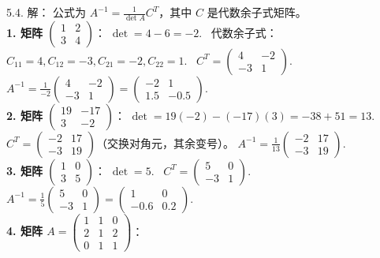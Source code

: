 \begin{exer}
5.4. 解：
公式为 $A^{-1} = \frac{1}{\det A} C^T$，其中 $C$ 是代数余子式矩阵。\\
\textbf{1. 矩阵 $\begin{pmatrix} 1 & 2 \\ 3 & 4 \end{pmatrix}$}：
$\det = 4 - 6 = -2$.~
代数余子式：$C_{11}=4, C_{12}=-3, C_{21}=-2, C_{22}=1$.~
$C^T = \begin{pmatrix} 4 & -2 \\ -3 & 1 \end{pmatrix}$.~
$A^{-1} = \frac{1}{-2} \begin{pmatrix} 4 & -2 \\ -3 & 1 \end{pmatrix} = \begin{pmatrix} -2 & 1 \\ 1.5 & -0.5 \end{pmatrix}$.~
\\
\textbf{2. 矩阵 $\begin{pmatrix} 19 & -17 \\ 3 & -2 \end{pmatrix}$}：
$\det = 19(-2) - (-17)(3) = -38 + 51 = 13$.~
$C^T = \begin{pmatrix} -2 & 17 \\ -3 & 19 \end{pmatrix}$（交换对角元，其余变号）。
$A^{-1} = \frac{1}{13} \begin{pmatrix} -2 & 17 \\ -3 & 19 \end{pmatrix}$.~
\\
\textbf{3. 矩阵 $\begin{pmatrix} 1 & 0 \\ 3 & 5 \end{pmatrix}$}：
$\det = 5$.~
$C^T = \begin{pmatrix} 5 & 0 \\ -3 & 1 \end{pmatrix}$.~
$A^{-1} = \frac{1}{5} \begin{pmatrix} 5 & 0 \\ -3 & 1 \end{pmatrix} = \begin{pmatrix} 1 & 0 \\ -0.6 & 0.2 \end{pmatrix}$.~
\\
\textbf{4. 矩阵 $A = \begin{pmatrix} 1 & 1 & 0 \\ 2 & 1 & 2 \\ 0 & 1 & 1 \end{pmatrix}$}：

\end{exer}
